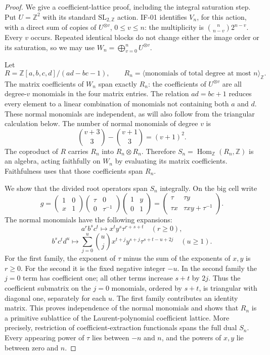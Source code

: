 \documentclass[11pt,a4paper]{article}
\theoremstyle{definition}
\theoremstyle{remark}
\begin{document}
\begin{proof}
We give a coefficient-lattice proof, including the integral saturation
step. Put $U=\mathbb Z^2$ with its standard $\mathrm{SL}_{2,\mathbb Z}$
action. IF-01 identifies $V_n$, for this action, with a direct sum of
copies of $U^{\otimes v}$, $0\leq v\leq n$: the multiplicity is
$\binom n{n-v}2^{n-v}$. Every $v$ occurs. Repeated identical blocks do
not change either the image order or its saturation, so we may use
$W_n=\bigoplus_{v=0}^n U^{\otimes v}$.

Let
\[
 R=\mathbb Z[a,b,c,d]/(ad-bc-1),\qquad
 R_n=\langle\text{monomials of total degree at most }n\rangle_{\mathbb Z}.
\]
The matrix coefficients of $W_n$ span exactly $R_n$: the coefficients
of $U^{\otimes v}$ are all degree-$v$ monomials in the four matrix
entries. The relation $ad=bc+1$ reduces every element to a linear
combination of monomials not containing both $a$ and $d$. These normal
monomials are independent, as will also follow from the triangular
calculation below. The number of normal monomials of degree $v$ is
\[
 \binom{v+3}{3}-\binom{v+1}{3}=(v+1)^2.
\]
The coproduct of $R$ carries $R_n$ into $R_n\otimes R_n$. Therefore
$S_n=\operatorname{Hom}_{\mathbb Z}(R_n,\mathbb Z)$ is an algebra, acting
faithfully on $W_n$ by evaluating its matrix coefficients. Faithfulness
uses that those coefficients span $R_n$.

We show that the divided root operators span $S_n$ integrally. On the
big cell write
\[
 g=\begin{pmatrix}1&0\\x&1\end{pmatrix}
   \begin{pmatrix}\tau&0\\0&\tau^{-1}\end{pmatrix}
   \begin{pmatrix}1&y\\0&1\end{pmatrix}
 =\begin{pmatrix}\tau&\tau y\\\tau x&\tau xy+\tau^{-1}\end{pmatrix}.
\]
The normal monomials have the following expansions:
\[
 a^r b^s c^t\mapsto x^t y^s\tau^{r+s+t}\quad(r\geq0),
\]
\[
 b^s c^t d^u\mapsto
 \sum_{j=0}^u\binom uj x^{t+j}y^{s+j}\tau^{s+t-u+2j}
 \quad(u\geq1).
\]
For the first family, the exponent of $\tau$ minus the sum of the
exponents of $x,y$ is $r\geq0$. For the second it is the fixed negative
integer $-u$. In the second family the $j=0$ term has coefficient one;
all other terms increase $s+t$ by $2j$. Thus the coefficient submatrix
on the $j=0$ monomials, ordered by $s+t$, is triangular with diagonal
one, separately for each $u$. The first family contributes an identity
matrix. This proves independence of the normal monomials and shows that
$R_n$ is a primitive sublattice of the Laurent-polynomial coefficient
lattice. More precisely, restriction of coefficient-extraction
functionals spans the full dual $S_n$. Every appearing power of
$\tau$ lies between $-n$ and $n$, and the powers of $x,y$ lie between
zero and $n$.


\end{proof}
\end{document}
